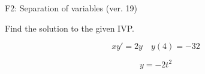 \begin{exercise}
  \begin{exerciseTitle}F2: Separation of variables (ver. 19)\end{exerciseTitle}
  \begin{exerciseStatement}
    
Find the solution to the given IVP.

    
\[xy'= 2 y \hspace{1em} y( 4 ) = -32\]

  \end{exerciseStatement}
  \begin{exerciseAnswer}
    
\[y= -2 t^ 2\]

  \end{exerciseAnswer}
\end{exercise}